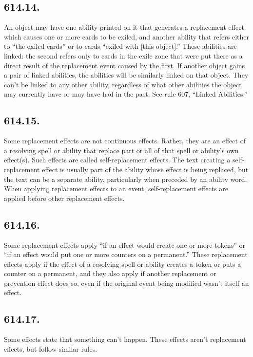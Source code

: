 \subsection*{614.14.}
An object may have one ability printed on it that generates a replacement effect which causes one or more cards to be exiled, and another ability that refers either to “the exiled cards” or to cards “exiled with [this object].” These abilities are linked: the second refers only to cards in the exile zone that were put there as a direct result of the replacement event caused by the first. If another object gains a pair of linked abilities, the abilities will be similarly linked on that object. They can’t be linked to any other ability, regardless of what other abilities the object may currently have or may have had in the past. See rule 607, “Linked Abilities.”

\subsection*{614.15.}
Some replacement effects are not continuous effects. Rather, they are an effect of a resolving spell or ability that replace part or all of that spell or ability’s own effect(s). Such effects are called self-replacement effects. The text creating a self-replacement effect is usually part of the ability whose effect is being replaced, but the text can be a separate ability, particularly when preceded by an ability word. When applying replacement effects to an event, self-replacement effects are applied before other replacement effects.

\subsection*{614.16.}
Some replacement effects apply “if an effect would create one or more tokens” or “if an effect would put one or more counters on a permanent.” These replacement effects apply if the effect of a resolving spell or ability creates a token or puts a counter on a permanent, and they also apply if another replacement or prevention effect does so, even if the original event being modified wasn’t itself an effect.

\subsection*{614.17.}
Some effects state that something can’t happen. These effects aren’t replacement effects, but follow similar rules.


